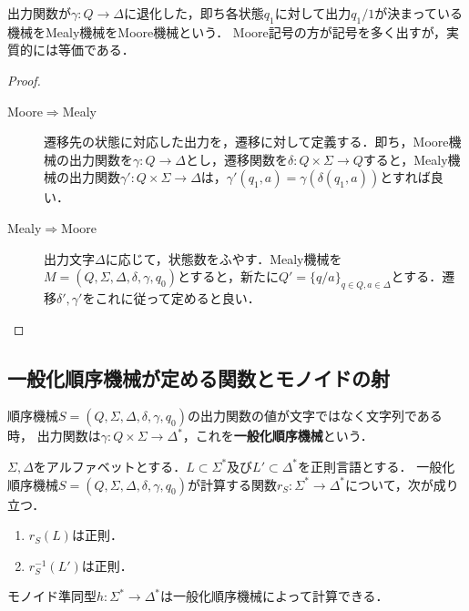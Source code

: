 \documentclass[uplatex, dvipdfmx]{jsreport}
\begin{document}
\begin{proposition}[Moore機械とMealy機械の等価性]
    出力関数が$\gamma:Q\to\Delta$に退化した，即ち各状態$q_1$に対して出力$q_1/1$が決まっている機械をMealy機械をMoore機械という．
    Moore記号の方が記号を多く出すが，実質的には等価である．
\end{proposition}
\begin{proof}\mbox{}
    \begin{description}
        \item[Moore$\Rightarrow$Mealy] 遷移先の状態に対応した出力を，遷移に対して定義する．即ち，Moore機械の出力関数を$\gamma:Q\to\Delta$とし，遷移関数を$\delta:Q\times\Sigma\to Q$すると，Mealy機械の出力関数$\gamma':Q\times\Sigma\to\Delta$は，$\gamma'(q_1,a)=\gamma(\delta(q_1,a))$とすれば良い．
        \item[Mealy$\Rightarrow$Moore] 出力文字$\Delta$に応じて，状態数をふやす．Mealy機械を$M=(Q,\Sigma,\Delta,\delta,\gamma,q_0)$とすると，新たに$Q'=\{q/a\}_{q\in Q,a\in\Delta}$とする．遷移$\delta',\gamma'$をこれに従って定めると良い．
    \end{description}
\end{proof}

\subsection{一般化順序機械が定める関数とモノイドの射}

\begin{definition}
    順序機械$S=(Q,\Sigma,\Delta,\delta,\gamma,q_0)$の出力関数の値が文字ではなく文字列である時，
    出力関数は$\gamma:Q\times\Sigma\to\Delta^*$，これを\textbf{一般化順序機械}という．
\end{definition}

\begin{theorem}[一般化順序機械が計算する関数は正則構造を保つ]
    $\Sigma,\Delta$をアルファベットとする．$L\subset\Sigma^*$及び$L'\subset\Delta^*$を正則言語とする．
    一般化順序機械$S=(Q,\Sigma,\Delta,\delta,\gamma,q_0)$が計算する関数$r_S:\Sigma^*\to\Delta^*$について，次が成り立つ．
    \begin{enumerate}
        \item $r_S(L)$は正則．
        \item $r_S^{-1}(L')$は正則．
    \end{enumerate}
\end{theorem}

\begin{proposition}
    モノイド準同型$h:\Sigma^*\to\Delta^*$は一般化順序機械によって計算できる．
\end{proposition}
\end{document}
